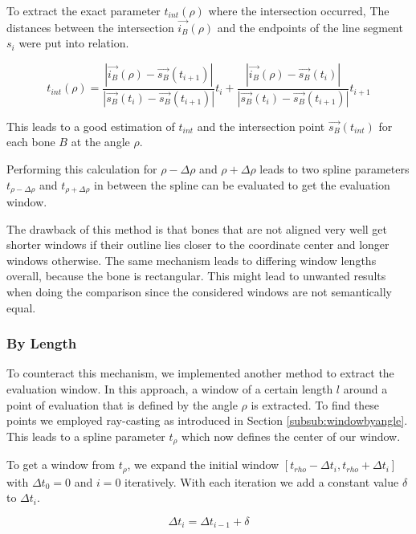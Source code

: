 \documentclass[pdftex,12pt,a4paper]{report}
\begin{document}
To extract the exact parameter $t_{int}(\rho)$ where the intersection occurred, The distances
between the intersection $\vec{i_B}(\rho)$ and the endpoints of the line segment $s_i$ were put into relation.

\begin{equation}
t_{int}(\rho) =
\frac{|\vec{i_B}(\rho) - \vec{s_B}(t_{i+1})|}{|\vec{s_B}(t_i) - \vec{s_B}(t_{i+1})|} t_i +
\frac{|\vec{i_B}(\rho) - \vec{s_B}(t_i)|}{|\vec{s_B}(t_i) - \vec{s_B}(t_{i+1})|} t_{i+1}
\end{equation}

This leads to a good estimation of $t_{int}$ and the intersection point $\vec{s_B}(t_{int})$
for each bone $B$ at the angle $\rho$.

Performing this calculation for $\rho-\Delta\rho$ and $\rho+\Delta\rho$ leads to two spline
parameters $t_{\rho-\Delta\rho}$ and $t_{\rho+\Delta\rho}$ in between the spline can be 
evaluated to get the evaluation window.

The drawback of this method is that bones that are not aligned very well get shorter windows
if their outline lies closer to the coordinate center and longer windows otherwise. The same mechanism leads to differing window lengths overall, because the bone is rectangular. This 
might lead to unwanted results when doing the comparison since the considered windows are
not semantically equal. 

\subsubsection{By Length}
\label{subsub:windowbylength}

To counteract this mechanism, we implemented another method to extract the evaluation window.
In this approach, a window of a certain length $l$ around a point of evaluation that is defined by the angle $\rho$ is extracted. To find these points we employed ray-casting
as introduced in Section \ref{subsub:windowbyangle}. This leads to a spline parameter
$t_\rho$ which now defines the center of our window.

To get a window from $t_\rho$, we expand the initial window $[t_{rho}-\Delta t_i,
t_{rho}+\Delta t_i]$ with $\Delta t_0 = 0$ and $i=0$ iteratively. With each iteration we add a constant value $\delta$ to $\Delta t_i$.

\begin{equation}
\Delta t_i = \Delta t_{i-1} + \delta
\end{equation}
\end{document}
